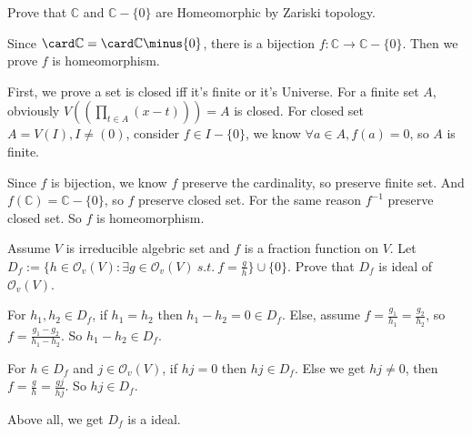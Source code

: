 \documentclass{ctexart}
\newif\ifpreface
\begin{document}
\large
\setlength{\baselineskip}{1.2em}
\ifpreface
    
\newgeometry{left=2cm,right=2cm,top=2cm,bottom=2cm}
\else
{}
\maketitle
\fi
\begin{problem}
 Prove that $\mathbb{C}$ and $\mathbb{C}\minus\{0\}$ are Homeomorphic by Zariski topology. 
\end{problem}

\begin{solution}
 Since $\card \mathbb{C}=\card \mathbb{C}\minus \{0\}$, there is a bijection $f:\mathbb{C}\to \mathbb{C}\minus\{0\}$. Then we prove $f$ is homeomorphism. 
 
 First, we prove a set is closed iff it's finite or it's Universe. For a finite set $A$, obviously $V((\prod_{t\in A}(x-t)))=A$ is closed. For closed set $A=V(I),I\neq (0)$, consider $f\in I\minus\{0\}$, we know $\forall a\in A,f(a)=0$, so $A$ is finite. 

 Since $f$ is bijection, we know $f$ preserve the cardinality, so preserve finite set. And $f(\mathbb{C})=\mathbb{C}\minus\{0\}$, so $f$ preserve closed set. For the same reason $f^{-1}$ preserve closed set. So $f$ is homeomorphism.  
\end{solution}

\begin{problem}
 Assume $V$ is irreducible algebric set and $f$ is a fraction function on $V$. Let $D_f:=\{h\in \mathcal{O}_v(V):\exists g\in \mathcal{O}_v(V)\ s.t.\ f=\frac{g}{h}\}\cup\{0\}$. Prove that $D_f$ is ideal of $\mathcal{O}_v(V)$. 
\end{problem}

\begin{solution}
 For $h_1,h_2\in D_f$, if $h_1=h_2$ then $h_1-h_2=0\in D_f$. Else, assume $f=\frac{g_1}{h_1}=\frac{g_2}{h_2}$, so $f=\frac{g_1-g_2}{h_1-h_2}$. So $h_1-h_2\in D_f$. 

 For $h\in D_f$ and $j\in \mathcal{O}_v(V)$, if $hj=0$ then $hj\in D_f$. Else we get $hj\neq 0$, then $f=\frac{g}{h}=\frac{gj}{hj}$. So $hj\in D_f$. 

 Above all, we get $D_f$ is a ideal. 
\end{solution}
\end{document}
